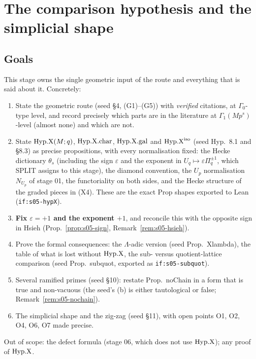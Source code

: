 \section{The comparison hypothesis and the simplicial shape}\label{sec:stage-05}
\providecommand{\BG}{\mathrm{BG}}          %
\providecommand{\Tpath}[1]{\texttt{#1}}
\providecommand{\cH}{\mathcal{H}}          %
\providecommand{\Xq}{X_q}                  %
\providecommand{\Ros}{\vee}                %
\providecommand{\Frob}{\mathrm{Frob}}

\subsection{Goals}
This stage owns the single geometric input of the route and everything that is said about it. Concretely:
\begin{enumerate}[label=(G\arabic*${}'$)]
\item State the geometric route (seed \S4, (G1)--(G5)) with \emph{verified} citations, at $\Gamma_0$-type level, and record
  precisely which parts are in the literature at $\Gamma_1(Mp^s)$-level (almost none) and which are not.
\item State $\mathrm{Hyp.X}(M;q)$, $\mathrm{Hyp.X.char}$, $\mathrm{Hyp.X.gal}$ and $\mathrm{Hyp.X}^{\mathrm{iso}}$ (seed Hyp.~8.1 and \S8.3) as precise propositions, with
  every normalisation fixed: the Hecke dictionary $\theta_s$ (including the sign $\varepsilon$ and the exponent in
  $U_q\mapsto\varepsilon\Pi_q^{\pm1}$, which SPLIT assigns to this stage), the diamond convention, the $U_p$ normalisation
  $N_{U_p}$ of stage 01, the functoriality on both sides, and the Hecke structure of the graded pieces in (X4). These are the
  exact Prop shapes exported to Lean (\texttt{if:s05-hypX}).
\item \textbf{Fix $\varepsilon=+1$ and the exponent $+1$}, and reconcile this with the opposite sign in Hsieh
  (Prop.~\ref{prop:s05-sign}, Remark~\ref{rem:s05-hsieh}).
\item Prove the formal consequences: the $\Lambda$-adic version (seed Prop.~Xlambda), the table of what is lost without
  $\mathrm{Hyp.X}$, the sub- versus quotient-lattice comparison (seed Prop.~subquot, exported as \texttt{if:s05-subquot}).
\item Several ramified primes (seed \S10): restate Prop.~noChain in a form that is true and non-vacuous (the seed's (b) is
  either tautological or false; Remark~\ref{rem:s05-nochain}).
\item The simplicial shape and the zig-zag (seed \S11), with open points O1, O2, O4, O6, O7 made precise.
\end{enumerate}
Out of scope: the defect formula (stage 06, which does not use $\mathrm{Hyp.X}$); any proof of $\mathrm{Hyp.X}$.

